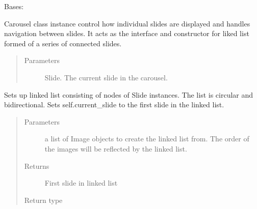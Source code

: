 \documentclass[letterpaper,10pt,english]{sphinxmanual}
\begin{document}
\begin{fulllineitems}
\label{\detokenize{polo.widgets:polo.widgets.slideshow_viewer.Carousel}}
Bases: 

Carousel class instance control how individual slides are
displayed and handles navigation between slides. It acts as the
interface and constructor for liked list formed of a series of
connected slides.
\begin{quote}\begin{description}
\item[{Parameters}] \leavevmode
{} \textendash{} Slide. The current slide in the carousel.

\end{description}\end{quote}

\begin{fulllineitems}
\label{\detokenize{polo.widgets:polo.widgets.slideshow_viewer.Carousel.add_slides}}
Sets up linked list consisting of nodes of Slide instances. The list
is circular and bi\sphinxhyphen{}directional. Sets self.current\_slide to the first
slide in the linked list.
\begin{quote}\begin{description}
\item[{Parameters}] \leavevmode
{} \textendash{} a list of Image objects to create the linked list            from. The order of the images will be reflected by the linked list.

\item[{Returns}] \leavevmode
First slide in linked list

\item[{Return type}] \leavevmode
{\hyperref[\detokenize{polo.widgets:polo.widgets.slideshow_viewer.Slide}]{}}

\end{description}\end{quote}

\end{fulllineitems}


\end{fulllineitems}
\end{document}
